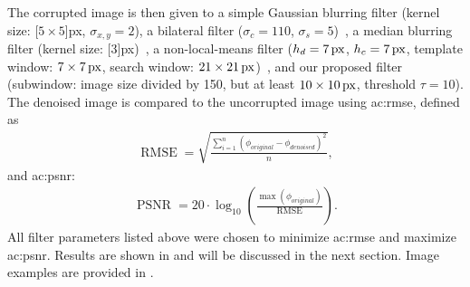 The corrupted image is then given to a simple Gaussian blurring filter (kernel size: \unit[$5 \times 5$]{px}, $\sigma_{x,y} = 2$), a bilateral filter ($\sigma_c = 110$, $\sigma_s = 5$)~\cite{tomasi1998bilateral}, a median blurring filter (kernel size: \unit[$3$]{px})~\cite[p. 129f]{sonka2014image}, a non-local-means filter ($h_d = \unit[7]{px}$, $h_c = \unit[7]{px}$, template window: $\unit[7 \times 7]{px}$, search window: $\unit[21 \times 21]{px}$)~\cite{buades2005non}, and our proposed filter (subwindow: image size divided by 150, but at least $\unit[10 \times 10]{px}$, threshold $\tau = 10$). 
The denoised image is compared to the uncorrupted image using \gls{ac:rmse}, defined as
\begin{align}
  \operatorname{RMSE}= \sqrt{\frac{\sum_{i=1}^n \left( \phi_{original} - \phi_{denoised} \right)^2}{n}},
  \label{eq:rmse}
\end{align}
and \gls{ac:psnr}:
\begin{align}
  \operatorname{PSNR} = 20 \cdot \log_{10} \left( \frac{\max(\phi_{original})}{\operatorname{RMSE}} \right).
  \label{eq:psnr}
\end{align}
All filter parameters listed above were chosen to minimize \gls{ac:rmse} and maximize \gls{ac:psnr}.
Results are shown in  and will be discussed in the next section.
Image examples are provided in .

